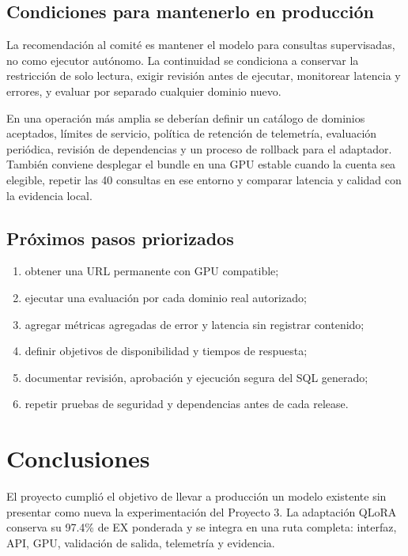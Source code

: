\documentclass[11pt,letterpaper]{article}
\begin{document}
\subsection{Condiciones para mantenerlo en producción}

La recomendación al comité es mantener el modelo para consultas supervisadas, no como ejecutor
autónomo. La continuidad se condiciona a conservar la restricción de solo lectura, exigir revisión
antes de ejecutar, monitorear latencia y errores, y evaluar por separado cualquier dominio nuevo.

En una operación más amplia se deberían definir un catálogo de dominios aceptados, límites de
servicio, política de retención de telemetría, evaluación periódica, revisión de dependencias y un
proceso de rollback para el adaptador. También conviene desplegar el bundle en una GPU estable cuando
la cuenta sea elegible, repetir las 40 consultas en ese entorno y comparar latencia y calidad con la
evidencia local.

\subsection{Próximos pasos priorizados}

\begin{enumerate}
  \item obtener una URL permanente con GPU compatible;
  \item ejecutar una evaluación por cada dominio real autorizado;
  \item agregar métricas agregadas de error y latencia sin registrar contenido;
  \item definir objetivos de disponibilidad y tiempos de respuesta;
  \item documentar revisión, aprobación y ejecución segura del SQL generado;
  \item repetir pruebas de seguridad y dependencias antes de cada release.
\end{enumerate}

\section{Conclusiones}

El proyecto cumplió el objetivo de llevar a producción un modelo existente sin presentar como nueva
la experimentación del Proyecto 3. La adaptación QLoRA conserva su 97.4\% de EX ponderada y se
integra en una ruta completa: interfaz, API, GPU, validación de salida, telemetría y evidencia.
\end{document}
